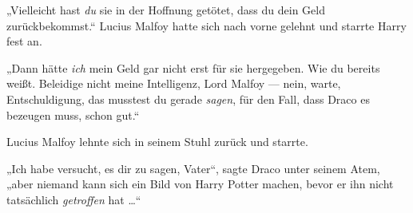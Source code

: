 „Vielleicht hast \emph{du} sie in der Hoffnung getötet, dass du dein Geld zurückbekommst.“ Lucius Malfoy hatte sich nach vorne gelehnt und starrte Harry fest an.

„Dann hätte \emph{ich} mein Geld gar nicht erst für sie hergegeben. Wie du bereits weißt. Beleidige nicht meine Intelligenz, Lord Malfoy — nein, warte, Entschuldigung, das musstest du gerade \emph{sagen}, für den Fall, dass Draco es bezeugen muss, schon gut.“

Lucius Malfoy lehnte sich in seinem Stuhl zurück und starrte.

„Ich habe versucht, es dir zu sagen, Vater“, sagte Draco unter seinem Atem, „aber niemand kann sich ein Bild von Harry Potter machen, bevor er ihn nicht tatsächlich \emph{getroffen} hat …“

